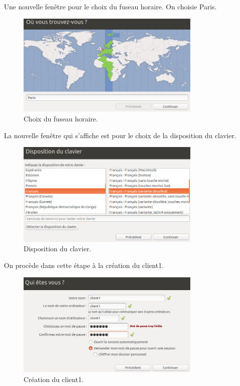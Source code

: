 \documentclass[11pt,a4paper,titlepage, oneside]{article}
\begin{document}
	\newpage
		Une nouvelle fenêtre pour le choix du fuseau horaire. On choisie Paris.
		 \begin{figure}[h]
                        \centering
                        \includegraphics[width=0.8\textwidth,natwidth=610,natheight=642]{images/demarrerISO4.png}
                        \caption{Choix du fuseau horaire.}
                \end{figure}
	\newpage
		La nouvelle fenêtre qui s'affiche est pour le choix de la disposition du clavier.

		 \begin{figure}[h]
                        \centering
                        \includegraphics[width=0.8\textwidth,natwidth=610,natheight=642]{images/demarrerISO5.png}
                        \caption{Disposition du clavier.}
                \end{figure}

		\newpage

		On procède dans cette étape à la création du client1.	
		\begin{figure}[h]
                        \centering
                        \includegraphics[width=0.8\textwidth,natwidth=610,natheight=642]{images/demarrerISO6.png}
                        \caption{Création du client1.}
                \end{figure}
\end{document}
